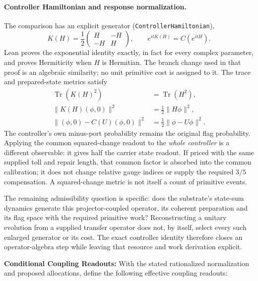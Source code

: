 \paragraph{Controller Hamiltonian and response normalization.} The comparison has an explicit generator (\texttt{ControllerHamiltonian}),
\begin{equation}
 K(H)=\frac12\begin{pmatrix}H&-H\\-H&H\end{pmatrix},
 \qquad e^{itK(H)}=C(e^{itH}).
\end{equation}
Lean proves the exponential identity exactly, in fact for every complex parameter, and proves Hermiticity when $H$ is Hermitian. The branch change used in that proof is an algebraic similarity; no unit primitive cost is assigned to it. The trace and prepared-state metrics satisfy
\begin{align}
 \operatorname{Tr}(K(H)^2)&=\operatorname{Tr}(H^2),\\
 \|K(H)(\phi,0)\|^2&=\tfrac12\|H\phi\|^2,\\
 \|(\phi,0)-C(U)(\phi,0)\|^2&=\tfrac12\|\phi-U\phi\|^2.
\end{align}
The controller's own minus-port probability remains the original flag probability. Applying the common squared-change readout to the \emph{whole controller} is a different observable: it gives half the carrier state readout. If priced with the same supplied toll and repair length, that common factor is absorbed into the common calibration; it does not change relative gauge indices or supply the required $3/5$ compensation. A squared-change metric is not itself a count of primitive events.

The remaining admissibility question is specific: does the substrate's state-sum dynamics generate this projector-coupled operator, its coherent preparation and its flag space with the required primitive work? Reconstructing a unitary evolution from a supplied transfer operator does not, by itself, select every such enlarged generator or its cost. The exact controller identity therefore closes an operator-algebra step while leaving that resource and work derivation explicit.

\textbf{Conditional Coupling Readouts:} With the stated rationalized normalization and proposed allocations, define the following effective coupling readouts:

